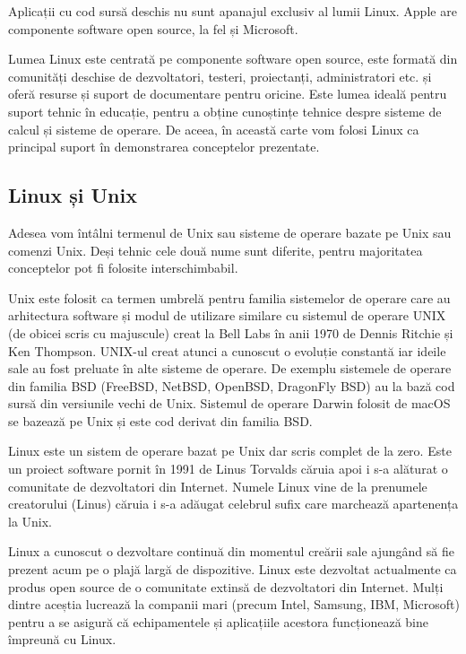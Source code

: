 Aplicații cu cod sursă deschis nu sunt apanajul exclusiv al lumii Linux. Apple are componente software open source, la fel și Microsoft.

Lumea Linux este centrată pe componente software open source, este formată din comunități deschise de dezvoltatori, testeri, proiectanți, administratori etc. și oferă resurse și suport de documentare pentru oricine. Este lumea ideală pentru suport tehnic în educație, pentru a obține cunoștințe tehnice despre sisteme de calcul și sisteme de operare. De aceea, în această carte vom folosi Linux ca principal suport în demonstrarea conceptelor prezentate.

\subsection{Linux și Unix}
\label{sec:intro:linux-unix}

Adesea vom întâlni termenul de Unix sau sisteme de operare bazate pe Unix sau comenzi Unix. Deși tehnic cele două nume sunt diferite, pentru majoritatea conceptelor pot fi folosite interschimbabil.

Unix este folosit ca termen umbrelă pentru familia sistemelor de operare care au arhitectura software și modul de utilizare similare cu sistemul de operare UNIX (de obicei scris cu majuscule) creat la Bell Labs în anii 1970 de Dennis Ritchie și Ken Thompson. UNIX-ul creat atunci a cunoscut o evoluție constantă iar ideile sale au fost preluate în alte sisteme de operare. De exemplu sistemele de operare din familia BSD (FreeBSD, NetBSD, OpenBSD, DragonFly BSD) au la bază cod sursă din versiunile vechi de Unix. Sistemul de operare Darwin folosit de macOS se bazează pe Unix și este cod derivat din familia BSD.

Linux este un sistem de operare bazat pe Unix dar scris complet de la zero. Este un proiect software pornit în 1991 de Linus Torvalds căruia apoi i s-a alăturat o comunitate de dezvoltatori din Internet. Numele Linux vine de la prenumele creatorului (Linus) căruia i s-a adăugat celebrul sufix care marchează apartenența la Unix.

Linux a cunoscut o dezvoltare continuă din momentul creării sale ajungând să fie prezent acum pe o plajă largă de dispozitive. Linux este dezvoltat actualmente ca produs open source de o comunitate extinsă de dezvoltatori din Internet. Mulți dintre aceștia lucrează la companii mari (precum Intel, Samsung, IBM, Microsoft) pentru a se asigură că echipamentele și aplicațiile acestora funcționează bine împreună cu Linux.

